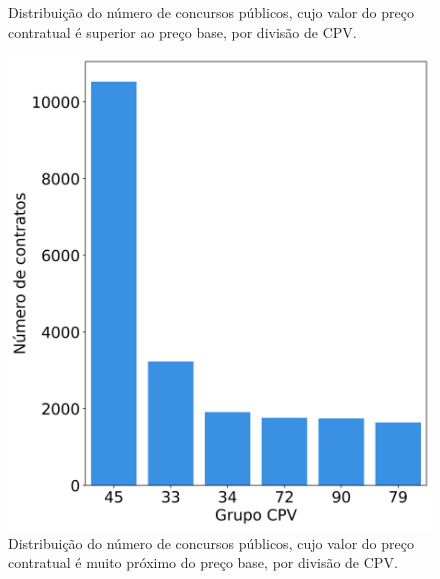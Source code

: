 \begin{figure}[h]
\begin{minipage}{.33\textwidth}
		\caption{Distribuição do número de concursos públicos, cujo valor do preço contratual é superior ao preço base, por divisão de CPV.}
		\label{fig:r31nulos2}
	\end{minipage}
	\begin{minipage}{.33\textwidth}
		\centering
		\includegraphics[width=1\linewidth]{imagens/r31/pcpbnear.png}
		\caption{Distribuição do número de concursos públicos, cujo valor do preço contratual é muito próximo do preço base, por divisão de CPV.}
		\label{fig:r31nulo3}
	\end{minipage}
\end{figure}

